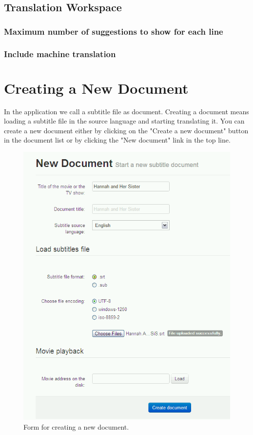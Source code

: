 \subsection{Translation Workspace}
\subsubsection{Maximum number of suggestions to show for each line}
\subsubsection{Include machine translation}

\section{Creating a New Document}

In the application we call a subtitle file as document. Creating a document means loading a subtitle file in the source language and starting translating it. You can create a new document either by clicking on the "Create a new document" button in the document list or by clicking the "New document" link in the top line.

\begin{figure}
\begin{center}
\includegraphics[scale=0.4]{figures/user_manual/new_document.png}
\end{center}
\caption{Form for creating a new document.}
\end{figure}

